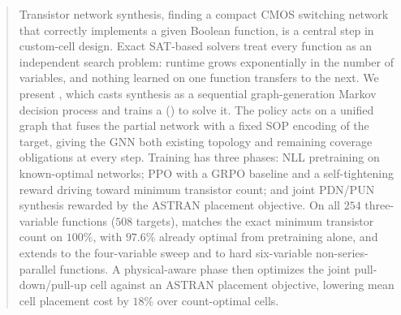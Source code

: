 \begin{abstract}
Transistor network synthesis, finding a compact CMOS switching network that
correctly implements a given Boolean function, is a central step in
custom-cell design.
Exact SAT-based solvers treat every function as an independent search problem:
runtime grows exponentially in the number of variables, and nothing learned on
one function transfers to the next.
We present \method, which casts synthesis as a sequential graph-generation
Markov decision process and trains a \sgpn (\SGPN) to solve it.
The policy acts on a unified graph that fuses the partial network with a fixed
SOP encoding of the target, giving the GNN both existing topology and remaining
coverage obligations at every step.
Training has three phases: NLL pretraining on known-optimal networks; PPO with
a GRPO baseline and a self-tightening reward driving toward minimum transistor
count; and joint PDN/PUN synthesis rewarded by the ASTRAN placement objective.
On all $254$ three-variable functions ($508$ targets), \method{} matches the
exact minimum transistor count on $100\%$, with $97.6\%$ already optimal from
pretraining alone, and extends to the four-variable sweep and to hard
six-variable non-series-parallel functions.
A physical-aware phase then optimizes the joint pull-down/pull-up cell against
an ASTRAN placement objective, lowering mean cell placement cost by $18\%$ over
count-optimal cells.
\end{abstract}


